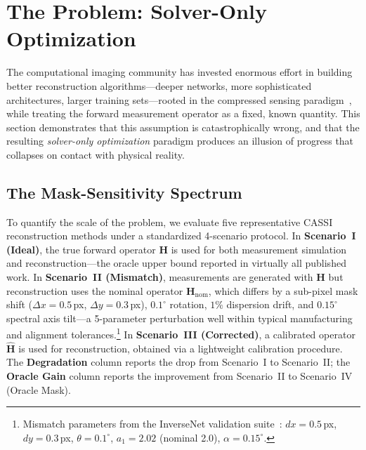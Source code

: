 
\section{The Problem: Solver-Only Optimization}
\label{sec:problem}

The computational imaging community has invested enormous effort in
building better reconstruction algorithms---deeper networks, more
sophisticated architectures, larger training sets---rooted in the
compressed sensing paradigm~\cite{donoho2006compressed,candes2008compressed}, while treating the
forward measurement operator as a fixed, known quantity.
This section demonstrates that this assumption is catastrophically
wrong, and that the resulting \emph{solver-only optimization} paradigm
produces an illusion of progress that collapses on contact with
physical reality.


\subsection{The Mask-Sensitivity Spectrum}
\label{sec:sensitivity}

To quantify the scale of the problem, we evaluate five representative
CASSI reconstruction methods under a standardized 4-scenario protocol.
In \textbf{Scenario~I (Ideal)}, the true forward operator $\mathbf{H}$
is used for both measurement simulation and reconstruction---the oracle
upper bound reported in virtually all published work.
In \textbf{Scenario~II (Mismatch)}, measurements are generated
with $\mathbf{H}$ but reconstruction uses the nominal operator
$\mathbf{H}_{\mathrm{nom}}$, which differs by a sub-pixel mask shift
($\Delta x\!=\!0.5$\,px, $\Delta y\!=\!0.3$\,px), $0.1^\circ$ rotation,
$1\%$ dispersion drift, and $0.15^\circ$ spectral axis tilt---a
5-parameter perturbation well within typical manufacturing and alignment
tolerances.\footnote{Mismatch parameters from the InverseNet validation
suite~\cite{yang2026inversenet}: $dx\!=\!0.5$\,px, $dy\!=\!0.3$\,px,
$\theta\!=\!0.1^\circ$, $a_1\!=\!2.02$ (nominal 2.0), $\alpha\!=\!0.15^\circ$.}
In \textbf{Scenario~III (Corrected)}, a calibrated operator
$\hat{\mathbf{H}}$ is used for reconstruction, obtained via a
lightweight calibration procedure.
The \textbf{Degradation} column reports the drop from Scenario~I to
Scenario~II; the \textbf{Oracle Gain} column reports the
improvement from Scenario~II to Scenario~IV (Oracle Mask).

